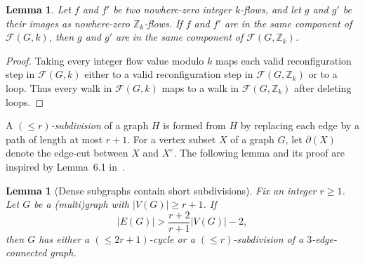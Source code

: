 \documentclass[a4paper,12pt]{article}
\theoremstyle{plain}
\newtheorem{lem}[theorem]{Lemma}
\theoremstyle{definition}
\newcommand{\Z}{\mathbb{Z}}
\newcommand\F{\mathcal{F}}
\renewcommand\le\leqslant
\renewcommand\ge\geqslant
\begin{document}
\begin{lem}
    \label{k-Zk-hom-lem}
    Let $f$ and $f'$ be two nowhere-zero integer $k$-flows, and let $g$ and $g'$ be their images as nowhere-zero $\Z_k$-flows.  If $f$ and $f'$ are in the same component of $\F(G,k)$, then $g$ and $g'$ are in the same component of $\F(G,\Z_k)$.
\end{lem}
\begin{proof}
    Taking every integer flow value modulo $k$ maps each valid reconfiguration step in $\F(G,k)$ either to a valid reconfiguration step in $\F(G,\Z_k)$ or to a loop.  Thus every walk in $\F(G,k)$ maps to a walk in $\F(G,\Z_k)$ after deleting loops.
\end{proof}


A \emph{$(\le r)$-subdivision} of a graph $H$ is formed from $H$ by replacing each edge by a path of length at most $r+1$. For a vertex subset $X$ of a graph $G$, let $\partial(X)$ denote the edge-cut between $X$ and $X^c$. The following lemma and its proof are inspired by Lemma~6.1 {in~\cite{esperet-et-al}}.

\begin{lem}[Dense subgraphs contain short subdivisions]
    \label{short-subdivision-density-lem}
    Fix an integer $r\ge 1$.  Let $G$ be a (multi)graph with $|V(G)|\ge r+1$.  If
    \begin{equation}
        |E(G)|>\frac{r+2}{r+1}|V(G)|-2,
        \label{density-ineq}
    \end{equation}
    then $G$ has either a $(\le 2r+1)$-cycle or a $(\le r)$-subdivision of a $3$-edge-connected graph.
\end{lem}
\end{document}
